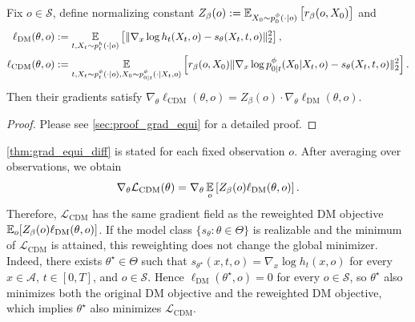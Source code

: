 \begin{theorem}
\label{thm:grad_equi_diff}
Fix $o \in\mathcal S$, define normalizing constant
$Z_{\beta}(o) := \operatorname*{{\mathbb{E}}}_{X_0 \sim p_0^\phi(\cdot|o)}\big[r_\beta(o,X_0)\big]$ and
\begin{align*}
    \ell_{\mathrm{DM}}(\theta,o)
    &:=
    \operatorname*{{\mathbb{E}}}_{t,X_t\sim p_t^h(\cdot|o)}
    \left[
        \|
        \nabla_x\log h_t(X_t,o)-s_\theta(X_t,t,o)
        \|_2^2
    \right],
    \\
    \ell_{\mathrm{CDM}}(\theta,o)
    &:=
    \operatorname*{{\mathbb{E}}}_{t,X_t\sim p_t^\phi(\cdot|o),X_0\sim p_{0|t}^\phi(\cdot|X_t,o)}
    \left[
        r_\beta(o,X_0)
        \|
        \nabla_x\log p_{0|t}^\phi(X_0|X_t,o)
        -
        s_\theta(X_t,t,o)
        \|_2^2
    \right].
\end{align*}
Then their gradients satisfy
$\nabla_\theta \ell_{\mathrm{CDM}}(\theta,o)
=
Z_{\beta}(o) \cdot \nabla_\theta \ell_{\mathrm{DM}}(\theta,o)$.
\end{theorem}

\begin{proof}
Please see \cref{sec:proof_grad_equi} for a detailed proof.
\end{proof}

\cref{thm:grad_equi_diff} is stated for each fixed observation $o$.
After averaging over observations, we obtain
\begin{align*}
    \nabla_\theta \mathcal L_{\mathrm{CDM}}(\theta)
    =
    \nabla_\theta \operatorname*{{\mathbb{E}}}_o \left[Z_{\beta}(o)\ell_{\mathrm{DM}}(\theta,o)\right].
\end{align*}
Therefore, $\mathcal L_{\mathrm{CDM}}$ has the same gradient field as the reweighted DM objective
$\operatorname*{{\mathbb{E}}}_o[Z_{\beta}(o)\ell_{\mathrm{DM}}(\theta,o)]$.
If the model class $\{s_\theta:\theta\in\Theta\}$ is realizable and the minimum of $\mathcal L_{\mathrm{CDM}}$ is attained, this reweighting does not change the global minimizer.
Indeed, there exists $\theta^\star\in\Theta$ such that
$s_{\theta^\star}(x,t,o)=\nabla_x\log h_t(x,o)$
for every $x\in\mathcal A$, $t\in[0,T]$, and $o\in\mathcal S$.
Hence $\ell_{\mathrm{DM}}(\theta^\star,o)=0$ for every $o\in\mathcal S$,
so $\theta^\star$ also minimizes both the original DM objective and the reweighted DM objective, which implies
$\theta^\star$ also minimizes $\mathcal L_{\mathrm{CDM}}$.


